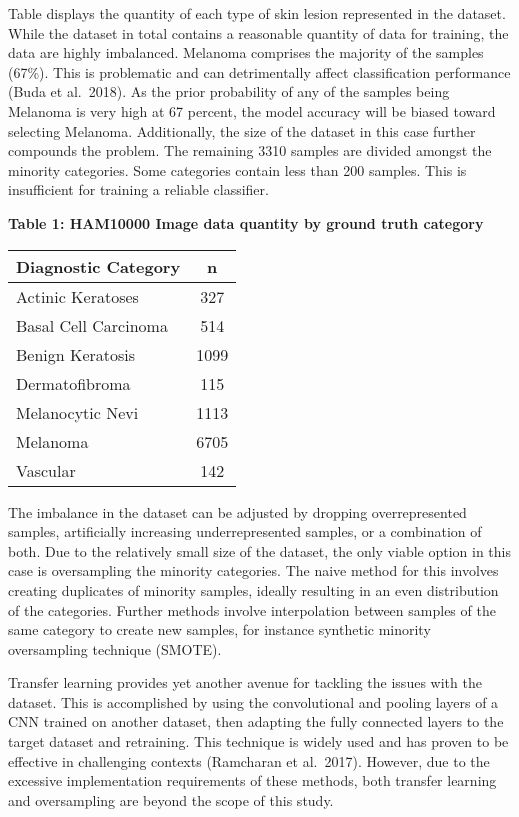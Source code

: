 \documentclass[11pt]{article}
\begin{document}
Table displays the quantity of each type of skin lesion represented in
the dataset. While the dataset in total contains a reasonable quantity
of data for training, the data are highly imbalanced. Melanoma comprises
the majority of the samples (67\%). This is problematic and can
detrimentally affect classification performance (Buda et al.~2018). As
the prior probability of any of the samples being Melanoma is very high
at 67 percent, the model accuracy will be biased toward selecting
Melanoma. Additionally, the size of the dataset in this case further
compounds the problem. The remaining 3310 samples are divided amongst
the minority categories. Some categories contain less than 200 samples.
This is insufficient for training a reliable classifier.

\textbf{Table 1: HAM10000 Image data quantity by ground truth category}

\begin{longtable}[]{@{}lc@{}}
\toprule
Diagnostic Category & n\tabularnewline
\midrule
\endhead
Actinic Keratoses & 327\tabularnewline
Basal Cell Carcinoma & 514\tabularnewline
Benign Keratosis & 1099\tabularnewline
Dermatofibroma & 115\tabularnewline
Melanocytic Nevi & 1113\tabularnewline
Melanoma & 6705\tabularnewline
Vascular & 142\tabularnewline
\bottomrule
\end{longtable}

The imbalance in the dataset can be adjusted by dropping overrepresented
samples, artificially increasing underrepresented samples, or a
combination of both. Due to the relatively small size of the dataset,
the only viable option in this case is oversampling the minority
categories. The naive method for this involves creating duplicates of
minority samples, ideally resulting in an even distribution of the
categories. Further methods involve interpolation between samples of the
same category to create new samples, for instance synthetic minority
oversampling technique (SMOTE).

Transfer learning provides yet another avenue for tackling the issues
with the dataset. This is accomplished by using the convolutional and
pooling layers of a CNN trained on another dataset, then adapting the
fully connected layers to the target dataset and retraining. This
technique is widely used and has proven to be effective in challenging
contexts (Ramcharan et al.~2017). However, due to the excessive
implementation requirements of these methods, both transfer learning and
oversampling are beyond the scope of this study.
\end{document}
